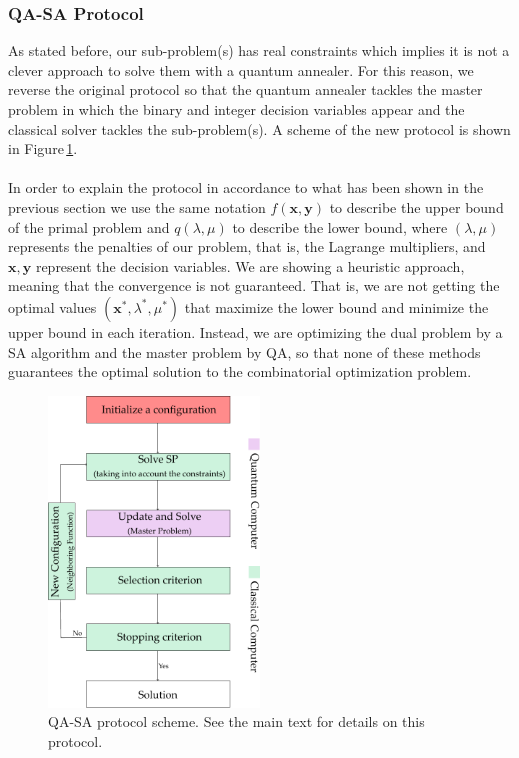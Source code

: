 \subsubsection{QA-SA Protocol}
 As stated before, our sub-problem(s) has real constraints which implies it is not a clever approach to solve them with a quantum annealer. For this reason, we reverse the original protocol so that the quantum annealer tackles the master problem in which the binary and integer decision variables appear and the classical solver tackles the sub-problem(s). A scheme of the new protocol is shown in Figure\,\ref{fig:QA_SAProtocol}.\\\\
In order to explain the protocol in accordance to what has been shown in the previous section we use the same notation $f(\mathbf{x}, \mathbf{y})$ to describe the upper bound of the primal problem and $q(\lambda,\mu)$ to describe the lower bound, where $(\lambda,\mu)$ represents the penalties of our problem, that is, the Lagrange multipliers, and $\mathbf{x},\mathbf{y}$ represent the decision variables. We are showing a heuristic approach, meaning that the convergence is not guaranteed. That is, we are not getting the optimal values $(\mathbf{x}^{*}, \lambda^{*},\mu^{*})$ that maximize the lower bound and minimize the upper bound in each iteration. Instead, we are optimizing the dual problem by a SA algorithm and the master problem by QA, so that none of these methods guarantees the optimal solution to the combinatorial optimization problem.
\begin{figure}[H]
\centering
\includegraphics[width=0.5\textwidth]{Figures/QASAProtocol.pdf} 
\caption{QA-SA protocol scheme. See the main text for details on this protocol.}
\label{fig:QA_SAProtocol}
\end{figure}

